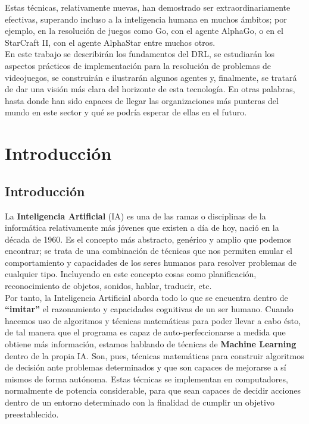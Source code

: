 \documentclass[11pt,fleqn]{book} %
\begin{document}
Estas técnicas, relativamente nuevas, han demostrado ser extraordinariamente efectivas, superando incluso a la inteligencia humana en muchos ámbitos; por ejemplo, en la resolución de juegos como Go, con el agente AlphaGo, o en el StarCraft II, con el agente AlphaStar entre muchos otros. \\

En este trabajo se describirán los fundamentos del DRL, se estudiarán los aspectos prácticos de implementación para la resolución de problemas de videojuegos, se construirán e ilustrarán algunos agentes y, finalmente, se tratará de dar una visión más clara del horizonte de esta tecnología. En otras palabras, hasta donde han sido capaces de llegar las organizaciones más punteras del mundo en este sector y qué se podría esperar de ellas en el futuro.

\part{Introducción}

\usechapterimagetrue
{} %

\chapter{Introducción}\label{sec:introduccion}

La \textbf{Inteligencia Artificial} (IA) es una de las ramas o disciplinas de la informática relativamente más jóvenes que existen a día de hoy, nació en la década de 1960. Es el concepto más abstracto, genérico y amplio que podemos encontrar; se trata de una combinación de técnicas que nos permiten emular el comportamiento y capacidades de los seres humanos para resolver problemas de cualquier tipo. Incluyendo en este concepto cosas como planificación, reconocimiento de objetos, sonidos, hablar, traducir, etc.\cite{article:IA} \\

Por tanto, la Inteligencia Artificial aborda todo lo que se encuentra dentro de \textbf{``imitar''} el razonamiento y capacidades cognitivas de un ser humano. Cuando hacemos uso de algoritmos y técnicas matemáticas para poder llevar a cabo ésto, de tal manera que el programa es capaz de auto-perfeccionarse a medida que obtiene más información, estamos hablando de técnicas de \textbf{Machine Learning} dentro de la propia IA. Son, pues, técnicas matemáticas para construir algoritmos de decisión ante problemas determinados y que son capaces de mejorarse a sí mismos de forma autónoma. Estas técnicas se implementan en computadores, normalmente de potencia considerable, para que sean capaces de decidir acciones dentro de un entorno determinado con la finalidad de cumplir un objetivo preestablecido. \\
\end{document}
